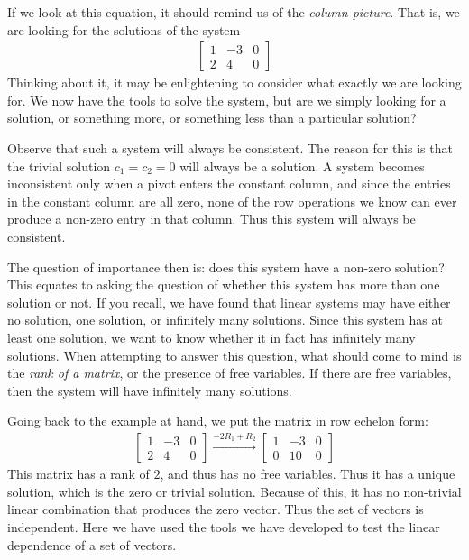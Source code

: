 \documentclass[11pt]{article}
\begin{document}
If we look at this equation, it should remind us of the \emph{column picture}. That is, we are looking for the solutions of the system
\begin{align*}
\left[\begin{matrix}
1 & -3 & 0
\\
2 & 4 & 0
\end{matrix}\right]
\end{align*}
Thinking about it, it may be enlightening to consider what exactly we are looking for. We now have the tools to solve the system, but are we simply looking for a solution, or something more, or something less than a particular solution?

Observe that such a system will always be consistent. The reason for this is that the trivial solution $c_1 = c_2 = 0$ will always be a solution. A system becomes inconsistent only when a pivot enters the constant column, and since the entries in the constant column are all zero, none of the row operations we know can ever produce a non-zero entry in that column. Thus this system will always be consistent.

The question of importance then is: does this system have a non-zero solution? This equates to asking the question of whether this system has more than one solution or not. If you recall, we have found that linear systems may have either no solution, one solution, or infinitely many solutions. Since this system has at least one solution, we want to know whether it in fact has infinitely many solutions. When attempting to answer this question, what should come to mind is the \emph{rank of a matrix}, or the presence of free variables. If there are free variables, then the system will have infinitely many solutions.

Going back to the example at hand, we put the matrix in row echelon form:
\begin{align*}
\left[\begin{matrix}
1 & -3 & 0
\\
2 & 4 & 0
\end{matrix}\right]
\xrightarrow[]{-2 R_1 + R_2}
\left[\begin{matrix}
1 & -3 & 0
\\
0 & 10 & 0
\end{matrix}\right]
\end{align*}
This matrix has a rank of $2$, and thus has no free variables. Thus it has a unique solution, which is the zero or trivial solution. Because of this, it has no non-trivial linear combination that produces the zero vector. Thus the set of vectors is independent. Here we have used the tools we have developed to test the linear dependence of a set of vectors.
\end{document}
